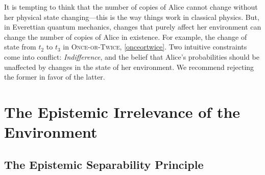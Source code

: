 \documentclass[onecolumn,secnumarabic,amsmath,amssymb,balancelastpage,nofootinbib]{article}
\begin{document}
It is tempting to think that the number of copies of Alice cannot change without her physical state changing---this is the way things work in classical physics.  But, in Everettian quantum mechanics, changes that purely affect her environment can change the number of copies of Alice in existence.  For example, the change of state from $t_2$ to $t_3$ in \textsc{Once-or-Twice}, \eqref{onceortwice}.  Two intuitive constraints come into conflict: \emph{Indifference}, and the belief that Alice's probabilities should be unaffected by changes in the state of her environment.  We recommend rejecting the former in favor of the latter.

\section{The Epistemic Irrelevance of the Environment}\label{newf}
\subsection{The Epistemic Separability Principle}\label{sec21}
\end{document}
